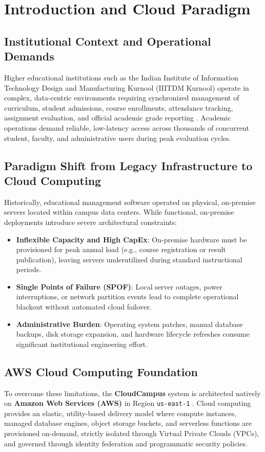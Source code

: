\newpage
\section{Introduction and Cloud Paradigm}

\subsection{Institutional Context and Operational Demands}
Higher educational institutions such as the Indian Institute of Information Technology Design and Manufacturing Kurnool (IIITDM Kurnool) operate in complex, data-centric environments requiring synchronized management of curriculum, student admissions, course enrollments, attendance tracking, assignment evaluation, and official academic grade reporting \cite{iiitdm_kurnool}. Academic operations demand reliable, low-latency access across thousands of concurrent student, faculty, and administrative users during peak evaluation cycles.

\subsection{Paradigm Shift from Legacy Infrastructure to Cloud Computing}
Historically, educational management software operated on physical, on-premise servers located within campus data centers. While functional, on-premise deployments introduce severe architectural constraints:
\begin{itemize}[leftmargin=*,itemsep=2pt]
    \item \textbf{Inflexible Capacity and High CapEx}: On-premise hardware must be provisioned for peak annual load (e.g., course registration or result publication), leaving servers underutilized during standard instructional periods.
    \item \textbf{Single Points of Failure (SPOF)}: Local server outages, power interruptions, or network partition events lead to complete operational blackout without automated cloud failover.
    \item \textbf{Administrative Burden}: Operating system patches, manual database backups, disk storage expansion, and hardware lifecycle refreshes consume significant institutional engineering effort.
\end{itemize}

\subsection{AWS Cloud Computing Foundation}
To overcome these limitations, the \textbf{CloudCampus} system is architected natively on \textbf{Amazon Web Services (AWS)} in Region \texttt{us-east-1} \cite{aws_ec2, aws_s3}. Cloud computing provides an elastic, utility-based delivery model where compute instances, managed database engines, object storage buckets, and serverless functions are provisioned on-demand, strictly isolated through Virtual Private Clouds (VPCs), and governed through identity federation and programmatic security policies.
